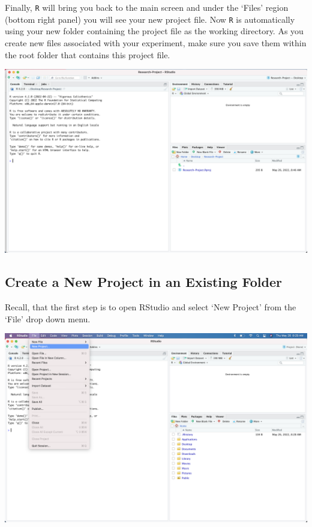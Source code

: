 \documentclass[
]{book}
\begin{document}
Finally, \texttt{R} will bring you back to the main screen and under the `Files' region (bottom right panel) you will see your new project file. Now \texttt{R} is automatically using your new folder containing the project file as the working directory. As you create new files associated with your experiment, make sure you save them within the root folder that contains this project file.

\includegraphics{images/D_new-project-in-new-folder-6.png}

\hypertarget{create-a-new-project-in-an-existing-folder}{%
\subsection*{Create a New Project in an Existing Folder}\label{create-a-new-project-in-an-existing-folder}}

Recall, that the first step is to open RStudio and select `New Project' from the `File' drop down menu.

\includegraphics{images/D_new-project-1.png}
\end{document}
